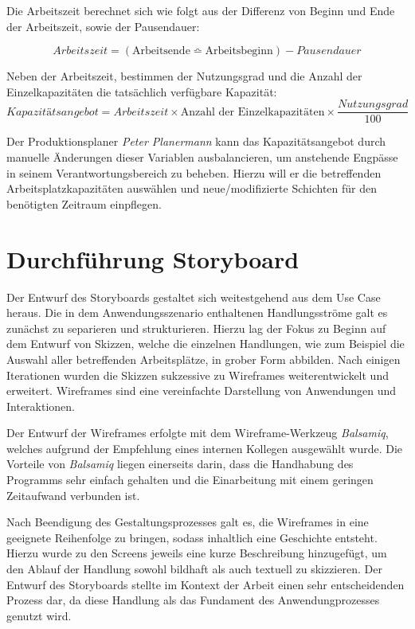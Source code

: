 Die Arbeitszeit berechnet sich wie folgt aus der Differenz von Beginn und Ende der Arbeitszeit, sowie der Pausendauer: 

\begin{equation*}
   Arbeitszeit=(\text{Arbeitsende}\bumpeq\text{Arbeitsbeginn})-Pausendauer
\end{equation*}

Neben der Arbeitszeit, bestimmen der Nutzungsgrad und die Anzahl der Einzelkapazitäten die tatsächlich verfügbare Kapazität:
\begin{equation*}
   Kapazitätsangebot=Arbeitszeit\times\text{Anzahl der Einzelkapazitäten}\times\frac{Nutzungsgrad}{100}
\end{equation*}

Der Produktionsplaner \textit{Peter Planermann} kann das Kapazitätsangebot durch manuelle Änderungen dieser Variablen ausbalancieren, um anstehende Engpässe in seinem Verantwortungsbereich zu beheben. Hierzu will er die betreffenden Arbeitsplatzkapazitäten auswählen und neue/modifizierte Schichten für den benötigten Zeitraum einpflegen.
% 
% 
% 
% 
% 
% 
\section{Durchführung Storyboard}
Der Entwurf des Storyboards gestaltet sich weitestgehend aus dem Use Case heraus. Die in dem Anwendungsszenario enthaltenen Handlungsströme galt es zunächst zu separieren und strukturieren. Hierzu lag der Fokus zu Beginn auf dem Entwurf von Skizzen, welche die einzelnen Handlungen, wie zum Beispiel die Auswahl aller betreffenden Arbeitsplätze, in grober Form abbilden. Nach einigen Iterationen wurden die Skizzen sukzessive zu Wireframes weiterentwickelt und erweitert. Wireframes sind eine vereinfachte Darstellung von Anwendungen und Interaktionen. \autocite{Moser.2012}

Der Entwurf der Wireframes erfolgte mit dem Wireframe-Werkzeug \textit{Balsamiq}, welches aufgrund der Empfehlung eines internen Kollegen ausgewählt wurde. Die Vorteile von \textit{Balsamiq} liegen einerseits darin, dass die Handhabung des Programms sehr einfach gehalten und die Einarbeitung mit einem geringen Zeitaufwand verbunden ist. 

Nach Beendigung des Gestaltungsprozesses galt es, die Wireframes in eine geeignete Reihenfolge zu bringen, sodass inhaltlich eine Geschichte entsteht. Hierzu wurde zu den Screens jeweils eine kurze Beschreibung hinzugefügt, um den Ablauf der Handlung sowohl bildhaft als auch textuell zu skizzieren. Der Entwurf des Storyboards stellte im Kontext der Arbeit einen sehr entscheidenden Prozess dar, da diese Handlung als das Fundament des Anwendungprozesses genutzt wird.

